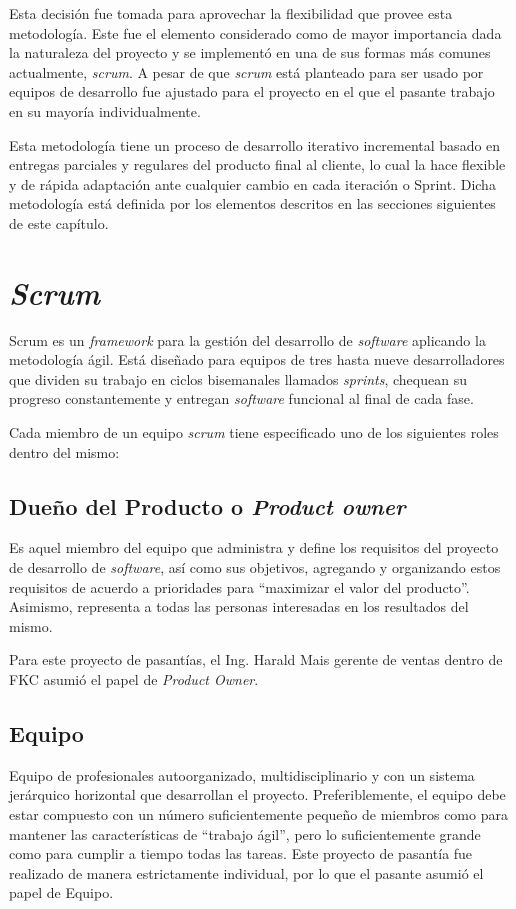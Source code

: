 Esta decisión fue tomada para aprovechar la flexibilidad que provee esta metodología. Este fue el elemento considerado como de mayor importancia dada la naturaleza del proyecto y se implementó en una de sus formas más comunes actualmente, \emph{scrum}. A pesar de que \emph{scrum} está planteado para ser usado por equipos de desarrollo fue ajustado para el proyecto en el que el pasante trabajo en su mayoría individualmente.

Esta metodología tiene un proceso de desarrollo iterativo incremental basado en entregas parciales y regulares del producto final al cliente, lo cual la hace flexible y de rápida adaptación ante cualquier cambio en cada iteración o Sprint. Dicha metodología está definida por los elementos descritos en las secciones siguientes de este capítulo.

\section{\emph{Scrum}}

Scrum es un \emph{framework} para la gestión del desarrollo de \emph{software} aplicando la metodología ágil. Está diseñado para equipos de tres hasta nueve desarrolladores que dividen su trabajo en ciclos bisemanales llamados \emph{sprints}, chequean su progreso constantemente y entregan \emph{software} funcional al final de cada fase. \cite{bib:scrum}

Cada miembro de un equipo \emph{scrum} tiene especificado uno de los siguientes roles dentro del mismo:

\subsection{Dueño del Producto o \emph{Product owner}}
Es aquel miembro del equipo que administra y define los requisitos del proyecto de desarrollo de \emph{software}, así como sus objetivos, agregando y organizando estos requisitos de acuerdo a prioridades para “maximizar el valor del producto”. Asimismo, representa a todas las personas interesadas en los resultados del mismo.

Para este proyecto de pasantías, el Ing. Harald Mais gerente de ventas dentro de \gls{FKC} asumió el papel de \emph{Product Owner}.

\subsection{Equipo}
Equipo de profesionales autoorganizado, multidisciplinario y con un sistema jerárquico horizontal que desarrollan el proyecto. Preferiblemente, el equipo debe estar compuesto con un número suficientemente pequeño de miembros como para mantener las características de “trabajo ágil”, pero lo suficientemente grande como para cumplir a tiempo todas las tareas.
Este proyecto de pasantía fue realizado de manera estrictamente individual, por lo que el pasante asumió el papel de Equipo.

